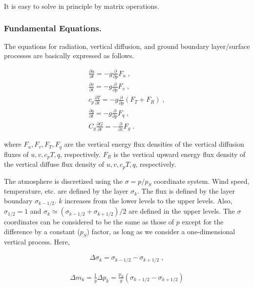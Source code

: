 It is easy to solve in principle by matrix operations.

\hypertarget{fundamental-equations.}{%
\subsubsection{Fundamental Equations.}\label{fundamental-equations.}}

The equations for radiation, vertical diffusion, and ground boundary
layer/surface processes are basically expressed as follows.

\begin{eqnarray}
     \frac{\partial{u}}{\partial {t}}   =   - g \frac{\partial{}}{\partial {p}} F_u \; , \\
     \frac{\partial{v}}{\partial {t}}   =   - g \frac{\partial{}}{\partial {p}} F_v \; , \\
 c_p \frac{\partial{T}}{\partial {t}}   =   - g \frac{\partial{}}{\partial {p}} ( F_T + F_R ) \; , \\
     \frac{\partial{q}}{\partial {t}}   =   - g \frac{\partial{}}{\partial {p}} F_q \; , \\
 C_g \frac{\partial{G}}{\partial {t}}   =   -   \frac{\partial{}}{\partial {z}} F_g \; .
\end{eqnarray}

where \(F_u, F_v, F_T, F_q\) are the vertical energy flux densities of
the vertical diffusion fluxes of \(u, v, c_p T, q\), respectively.
\(F_R\) is the vertical upward energy flux density of the vertical
diffuse flux density of \(u, v, c_p T, q\), respectively.

The atmosphere is discretized using the \(\sigma=p/p_S\) coordinate
system. Wind speed, temperature, etc. are defined by the layer
\(\sigma_k\). The flux is defined by the layer boundary
\(\sigma_{k-1/2}\). \(k\) increases from the lower levels to the upper
levels. Also, \(\sigma_{1/2} = 1\) and
\(\sigma_{k} \simeq (\sigma_{k-1/2} + \sigma_{k+1/2})/2\) are defined in
the upper levels. The \(\sigma\) coordinates can be considered to be the
same as those of \(p\) except for the difference by a constant (\(p_S\))
factor, as long as we consider a one-dimensional vertical process. Here,

\begin{eqnarray}
  \Delta \sigma_{k} = \sigma_{k-1/2} - \sigma_{k+1/2} \; ,
\end{eqnarray}

\begin{eqnarray}
  \Delta m_{k} = \frac{1}{g} \Delta p_k
   = \frac{p_S}{g} ( \sigma_{k-1/2} - \sigma_{k+1/2} )
\end{eqnarray}

